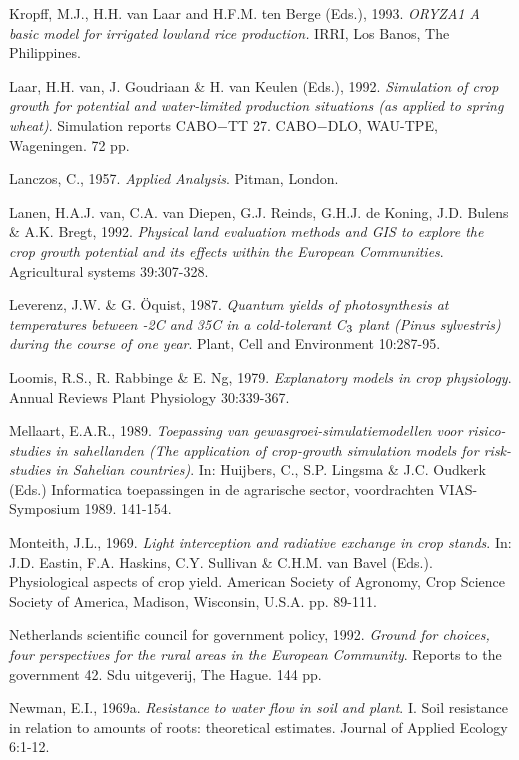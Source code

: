 Kropff, M.J., H.H. van Laar and H.F.M. ten Berge (Eds.), 1993. {\it ORYZA1 A basic model for
irrigated lowland rice production.\/} IRRI, Los Banos, The Philippines.

Laar, H.H. van, J. Goudriaan \& H. van Keulen (Eds.), 1992. {\it Simula\-tion of crop growth for
potential and water-limited production situations (as applied to spring wheat)\/}. Simulation reports
CABO$-$TT 27. CABO$-$DLO, WAU-TPE, {\nobreak}Wageningen. 72 pp.

Lanczos, C., 1957. {\it Applied Analysis\/}. Pitman, London.

Lanen, H.A.J. van, C.A. van Diepen, G.J. Reinds, G.H.J. de Koning, J.D. Bulens \& A.K. Bregt,
1992. {\it Physical land evaluation methods and GIS to explore the crop growth potential and its effects
within the European Commun\-ities\/}. Agricultural systems 39:307-328.

Leverenz, J.W. \& G. \"{O}quist, 1987. {\it Quantum yields of photosynthesis at temperatures between -2\degrees C
and 35\degrees C in a cold-tolerant C$_{{\rm 3}}$ plant (Pinus sylvestris) during the course of one year\/}. Plant, Cell and
Environment 10:287-95.

Loomis, R.S., R. Rabbinge \& E. Ng, 1979. {\it Explanatory models in crop physiology\/}. Annual Reviews
Plant Physiology 30:339-367.

Mellaart, E.A.R., 1989. {\it Toepassing van gewasgroei-{\nobreak}simulatiemodellen voor risico-studies in
sahellanden (The application of crop-growth simulation models for risk-studies in Sahelian countries)\/}.
In: Huijbers, C., S.P. Lingsma \& J.C. Oudkerk (Eds.) Informatica toepassingen in de agrarische
sector, voordrachten VIAS-Symposium 1989. 141-154.

Monteith, J.L., 1969. {\it Light interception and radiative exchange in crop stands\/}. In: J.D. Eastin, F.A.
Haskins, C.Y. Sullivan \& C.H.M. van Bavel (Eds.). Physiological aspects of crop yield. American
Society of Agronomy, Crop Science  Society of America, Madison, Wisconsin, U.S.A. pp. 89-111.

Netherlands scientific council for government policy, 1992. {\it Ground for choices, four perspectives
for the rural areas in the European Community\/}. Reports to the government 42. Sdu uitgeverij, The
Hague. 144 pp.

Newman, E.I., 1969a. {\it Resistance to water flow in soil and plant\/}. I. Soil resistance in relation to
amounts of roots: theoretical estimates. Journal of Applied Ecology 6:1-12.

